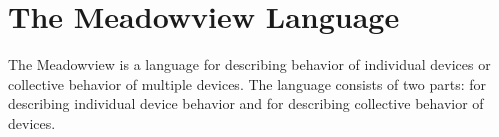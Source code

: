 \documentclass{note}
\begin{document}
{%






\section{The Meadowview Language}
The Meadowview is a language for describing behavior of individual devices
or collective behavior of multiple devices.
The language consists of two parts: \textcolor{blue2}{}
for describing individual device behavior
and  \textcolor{blue2}{} for describing
collective behavior of devices.



}
\end{document}
